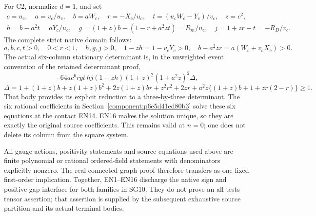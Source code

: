 For C2, normalize \(d=1\), and set
\[
\begin{gathered}
 c=u_c,\quad a=v_c/u_c,\quad b=aW_c,\quad r=-X_c/u_c,\quad
 t=(u_cW_c-Y_c)/v_c,\quad z=c^2,\\
 h=b-a^2t=aY_c/u_c,\quad
 g=(1+z)b-(1-r+a^2zt)=R_m/u_c,\quad
 j=1+zr-t=-R_D/v_c .
\end{gathered}\tag{EN14}
\]
The complete strict native domain follows:
\[
 a,b,c,t>0,\quad 0<r<1,\quad h,g,j>0,\quad
 1-zh=1-v_cY_c>0,\quad b-a^2zr=a(W_c+v_cX_c)>0.
 \tag{EN15}
\]
The actual six-column stationary determinant is, in the unweighted
event convention of the retained determinant proof,
\[
 -64ac^6rgt\,hj(1-zh)(1+z)^2(1+a^2z)^2\Delta,
\]
\[
 \Delta=1+(1+z)b+z(1+z)b^2+2z(1+z)br+z^2r^2+2zr
        +a^2z\{(1+z)b+1+zr(2-r)\}\ge1 .
 \tag{EN16}
\]
That body provides its explicit reduction to a three-by-three
determinant.  The six rational coefficients in
Section~\ref{component:p6e5d41ed80b3} solve these six equations at the
contact EN14.  EN16 makes the solution unique, so they are exactly
the original source coefficients.  This remains valid at \(n=0\);
one does not delete its column from the square system.

All gauge actions, positivity statements and source equations used
above are finite polynomial or rational ordered-field statements
with denominators explicitly nonzero.  The real connected-graph
proof therefore transfers as one fixed first-order implication.
Together, EN1--EN16 discharge the native sign and positive-gap
interface for both families in SG10.  They do not prove an
all-tests tensor assertion; that assertion is supplied by the
subsequent exhaustive source partition and its actual terminal bodies.

